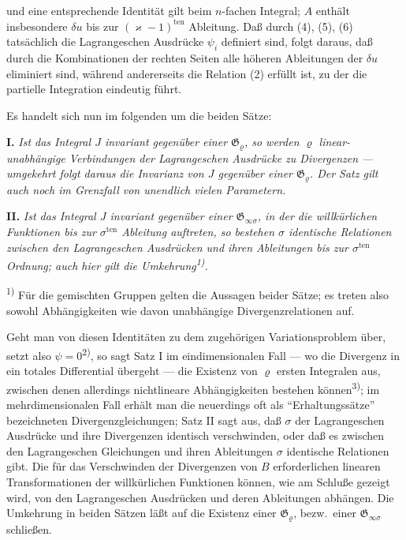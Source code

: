 \documentclass[12pt,a4paper]{article}
\begin{document}
und eine entsprechende Identit\"at gilt beim $n$-fachen Integral; $A$ enth\"alt insbesondere $\delta u$ bis zur $(\varkappa-1)^{\mathrm{ten}}$ Ableitung. Da\ss{} durch (4), (5), (6) tats\"achlich die Lagrangeschen Ausdr\"ucke $\psi_{i}$ definiert sind, folgt daraus, da\ss{} durch die Kombinationen der rechten Seiten alle h\"oheren Ableitungen der $\delta u$ eliminiert sind, w\"ahrend andererseits die Relation (2) erf\"ullt ist, zu der die partielle Integration eindeutig f\"uhrt.

Es handelt sich nun im folgenden um die beiden S\"atze:

\medskip
\noindent\textbf{I.} \textit{Ist das Integral $J$ invariant gegen\"uber einer $\mathfrak{G}_{\varrho}$, so werden $\varrho$ linear-unabh\"angige Verbindungen der Lagrangeschen Ausdr\"ucke zu Divergenzen --- umgekehrt folgt daraus die Invarianz von $J$ gegen\"uber einer $\mathfrak{G}_{\varrho}$. Der Satz gilt auch noch im Grenzfall von unendlich vielen Parametern.}

\medskip
\noindent\textbf{II.} \textit{Ist das Integral $J$ invariant gegen\"uber einer $\mathfrak{G}_{\infty\sigma}$, in der die willk\"urlichen Funktionen bis zur $\sigma^{\mathrm{ten}}$ Ableitung auftreten, so bestehen $\sigma$ identische Relationen zwischen den Lagrangeschen Ausdr\"ucken und ihren Ableitungen bis zur $\sigma^{\mathrm{ten}}$ Ordnung; auch hier gilt die Umkehrung\textsuperscript{1)}.}

\smallskip
\noindent\textsuperscript{1)} F\"ur die gemischten Gruppen gelten die Aussagen beider S\"atze; es treten also sowohl Abh\"angigkeiten wie davon unabh\"angige Divergenzrelationen auf.

\medskip

Geht man von diesen Identit\"aten zu dem zugeh\"origen Variationsproblem \"uber, setzt also $\psi=0$\textsuperscript{2)}, so sagt Satz I im eindimensionalen Fall --- wo die Divergenz in ein totales Differential \"ubergeht --- die Existenz von $\varrho$ ersten Integralen aus, zwischen denen allerdings nichtlineare Abh\"angigkeiten bestehen k\"onnen\textsuperscript{3)}; im mehrdimensionalen Fall erh\"alt man die neuerdings oft als ``Erhaltungss\"atze'' bezeichneten Divergenzgleichungen; Satz II sagt aus, da\ss{} $\sigma$ der Lagrangeschen Ausdr\"ucke und ihre Divergenzen identisch verschwinden, oder da\ss{} es zwischen den Lagrangeschen Gleichungen und ihren Ableitungen $\sigma$ identische Relationen gibt. Die f\"ur das Verschwinden der Divergenzen von $B$ erforderlichen linearen Transformationen der willk\"urlichen Funktionen k\"onnen, wie am Schlu\ss{}e gezeigt wird, von den Lagrangeschen Ausdr\"ucken und deren Ableitungen abh\"angen. Die Umkehrung in beiden S\"atzen l\"a\ss{}t auf die Existenz einer $\mathfrak{G}_{\varrho}$, bezw.\ einer $\mathfrak{G}_{\infty\sigma}$ schlie\ss{}en.
\end{document}
